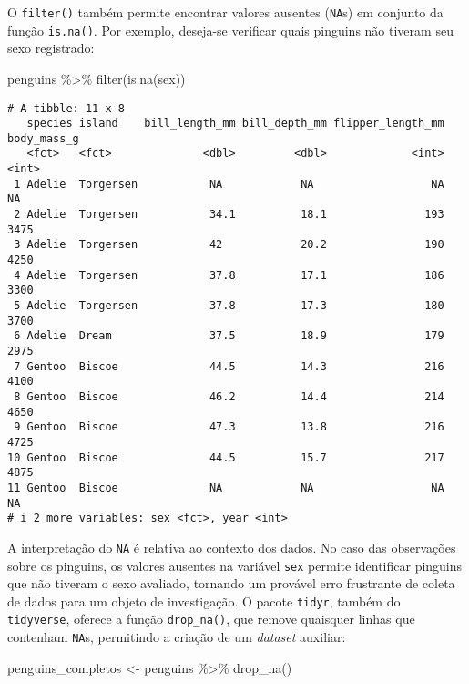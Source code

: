 \documentclass[
  12pt,
  letterpaper,
  DIV=11,
  numbers=noendperiod]{scrreprt}
\newenvironment{Shaded}{\begin{snugshade}}{\end{snugshade}}
\newcommand{\FunctionTok}[1]{\textcolor[rgb]{0.28,0.35,0.67}{#1}}
\newcommand{\NormalTok}[1]{\textcolor[rgb]{0.00,0.23,0.31}{#1}}
\newcommand{\OtherTok}[1]{\textcolor[rgb]{0.00,0.23,0.31}{#1}}
\newcommand{\SpecialCharTok}[1]{\textcolor[rgb]{0.37,0.37,0.37}{#1}}
\begin{document}
O \texttt{filter()} também permite encontrar valores ausentes
(\texttt{NA}s) em conjunto da função \texttt{is.na()}. Por exemplo,
deseja-se verificar quais pinguins não tiveram seu sexo registrado:

\begin{Shaded}
\begin{Highlighting}[]
\NormalTok{penguins }\SpecialCharTok{\%\textgreater{}\%} 
  \FunctionTok{filter}\NormalTok{(}\FunctionTok{is.na}\NormalTok{(sex))}
\end{Highlighting}
\end{Shaded}

\begin{verbatim}
# A tibble: 11 x 8
   species island    bill_length_mm bill_depth_mm flipper_length_mm body_mass_g
   <fct>   <fct>              <dbl>         <dbl>             <int>       <int>
 1 Adelie  Torgersen           NA            NA                  NA          NA
 2 Adelie  Torgersen           34.1          18.1               193        3475
 3 Adelie  Torgersen           42            20.2               190        4250
 4 Adelie  Torgersen           37.8          17.1               186        3300
 5 Adelie  Torgersen           37.8          17.3               180        3700
 6 Adelie  Dream               37.5          18.9               179        2975
 7 Gentoo  Biscoe              44.5          14.3               216        4100
 8 Gentoo  Biscoe              46.2          14.4               214        4650
 9 Gentoo  Biscoe              47.3          13.8               216        4725
10 Gentoo  Biscoe              44.5          15.7               217        4875
11 Gentoo  Biscoe              NA            NA                  NA          NA
# i 2 more variables: sex <fct>, year <int>
\end{verbatim}

A interpretação do \texttt{NA} é relativa ao contexto dos dados. No caso
das observações sobre os pinguins, os valores ausentes na variável
\texttt{sex} permite identificar pinguins que não tiveram o sexo
avaliado, tornando um provável erro frustrante de coleta de dados para
um objeto de investigação. O pacote \texttt{tidyr}, também do
\texttt{tidyverse}, oferece a função \texttt{drop\_na()}, que remove
quaisquer linhas que contenham \texttt{NA}s, permitindo a criação de um
\emph{dataset} auxiliar:

\begin{Shaded}
\begin{Highlighting}[]
\NormalTok{penguins\_completos }\OtherTok{\textless{}{-}}\NormalTok{ penguins }\SpecialCharTok{\%\textgreater{}\%} 
  \FunctionTok{drop\_na}\NormalTok{()}
\end{Highlighting}
\end{Shaded}
\end{document}
